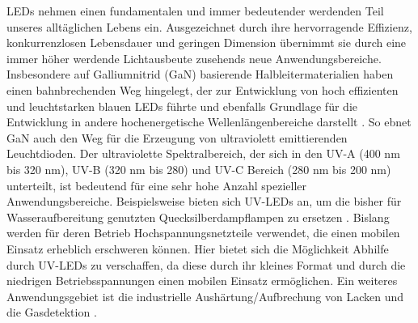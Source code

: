 LEDs nehmen einen fundamentalen und immer bedeutender werdenden Teil unseres alltäglichen Lebens ein. Ausgezeichnet durch ihre hervorragende Effizienz, konkurrenzlosen Lebensdauer und geringen Dimension übernimmt sie durch eine immer höher werdende Lichtausbeute zusehends neue Anwendungsbereiche.
\newline
Insbesondere auf Galliumnitrid (GaN) basierende Halbleitermaterialien haben einen bahnbrechenden Weg hingelegt, der zur Entwicklung von hoch effizienten und leuchtstarken blauen LEDs führte und ebenfalls Grundlage für die Entwicklung in andere hochenergetische Wellenlängenbereiche darstellt \cite{risk} \cite{Shuji1999CandelaclassHI} \cite{10007979421}. So ebnet GaN auch den Weg für die Erzeugung von ultraviolett emittierenden Leuchtdioden. Der ultraviolette Spektralbereich, der sich in den UV-A (400 nm bis 320 nm), UV-B (320 nm bis 280) und UV-C Bereich (280 nm bis 200 nm) unterteilt, ist bedeutend für eine sehr hohe Anzahl spezieller Anwendungsbereiche. 
\newline
Beispielsweise bieten sich UV-LEDs an, um die bisher für Wasseraufbereitung genutzten Quecksilberdampflampen zu ersetzen \cite{Vilhunen2009} \cite{WURTELE20111481}. Bislang werden für deren Betrieb Hochspannungsnetzteile verwendet, die einen mobilen Einsatz erheblich erschweren können. Hier bietet sich die Möglichkeit Abhilfe durch UV-LEDs zu verschaffen, da diese durch ihr kleines Format und durch die niedrigen Betriebsspannungen einen mobilen Einsatz ermöglichen. Ein weiteres Anwendungsgebiet ist die industrielle Aushärtung/Aufbrechung von Lacken und die Gasdetektion \cite{0268-1242-26-1-014036} \cite{LALINSKY2010152}. 
\iffalse
